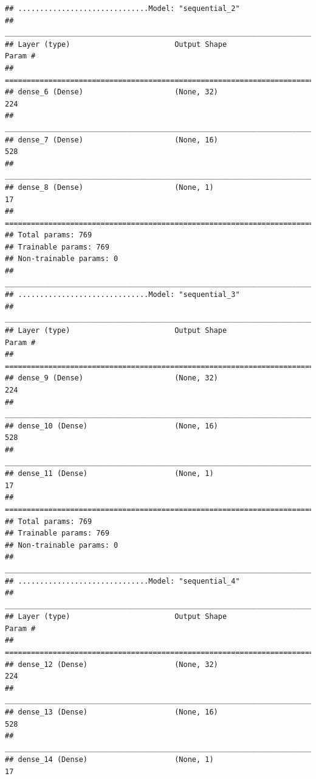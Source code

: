 \documentclass[
]{article}
\begin{document}
\begin{verbatim}
## ..............................Model: "sequential_2"
## ________________________________________________________________________________
## Layer (type)                        Output Shape                    Param #     
## ================================================================================
## dense_6 (Dense)                     (None, 32)                      224         
## ________________________________________________________________________________
## dense_7 (Dense)                     (None, 16)                      528         
## ________________________________________________________________________________
## dense_8 (Dense)                     (None, 1)                       17          
## ================================================================================
## Total params: 769
## Trainable params: 769
## Non-trainable params: 0
## ________________________________________________________________________________
## ..............................Model: "sequential_3"
## ________________________________________________________________________________
## Layer (type)                        Output Shape                    Param #     
## ================================================================================
## dense_9 (Dense)                     (None, 32)                      224         
## ________________________________________________________________________________
## dense_10 (Dense)                    (None, 16)                      528         
## ________________________________________________________________________________
## dense_11 (Dense)                    (None, 1)                       17          
## ================================================================================
## Total params: 769
## Trainable params: 769
## Non-trainable params: 0
## ________________________________________________________________________________
## ..............................Model: "sequential_4"
## ________________________________________________________________________________
## Layer (type)                        Output Shape                    Param #     
## ================================================================================
## dense_12 (Dense)                    (None, 32)                      224         
## ________________________________________________________________________________
## dense_13 (Dense)                    (None, 16)                      528         
## ________________________________________________________________________________
## dense_14 (Dense)                    (None, 1)                       17          

\end{verbatim}
\end{document}
